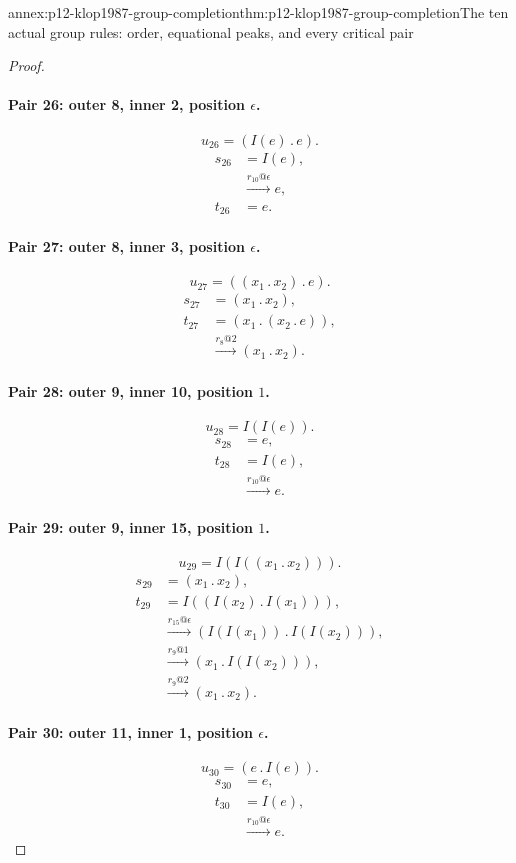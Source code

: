 \begin{annexitem}{annex:p12-klop1987-group-completion}{thm:p12-klop1987-group-completion}{The ten actual group rules: order, equational peaks, and every critical pair}
\begin{proof}
\paragraph{Pair 26: outer 8, inner 2, position \(\epsilon\).}
\[
 u_{26}=(I(e)\mathbin{.}e).
\]
\begin{align*}
 s_{26}&=I(e),\\
 &\xrightarrow{r_{10}@\epsilon}e,\\
 t_{26}&=e.
\end{align*}

\paragraph{Pair 27: outer 8, inner 3, position \(\epsilon\).}
\[
 u_{27}=((x_{1}\mathbin{.}x_{2})\mathbin{.}e).
\]
\begin{align*}
 s_{27}&=(x_{1}\mathbin{.}x_{2}),\\
 t_{27}&=(x_{1}\mathbin{.}(x_{2}\mathbin{.}e)),\\
 &\xrightarrow{r_{8}@2}(x_{1}\mathbin{.}x_{2}).
\end{align*}

\paragraph{Pair 28: outer 9, inner 10, position \(1\).}
\[
 u_{28}=I(I(e)).
\]
\begin{align*}
 s_{28}&=e,\\
 t_{28}&=I(e),\\
 &\xrightarrow{r_{10}@\epsilon}e.
\end{align*}

\paragraph{Pair 29: outer 9, inner 15, position \(1\).}
\[
 u_{29}=I(I((x_{1}\mathbin{.}x_{2}))).
\]
\begin{align*}
 s_{29}&=(x_{1}\mathbin{.}x_{2}),\\
 t_{29}&=I((I(x_{2})\mathbin{.}I(x_{1}))),\\
 &\xrightarrow{r_{15}@\epsilon}(I(I(x_{1}))\mathbin{.}I(I(x_{2}))),\\
 &\xrightarrow{r_{9}@1}(x_{1}\mathbin{.}I(I(x_{2}))),\\
 &\xrightarrow{r_{9}@2}(x_{1}\mathbin{.}x_{2}).
\end{align*}

\paragraph{Pair 30: outer 11, inner 1, position \(\epsilon\).}
\[
 u_{30}=(e\mathbin{.}I(e)).
\]
\begin{align*}
 s_{30}&=e,\\
 t_{30}&=I(e),\\
 &\xrightarrow{r_{10}@\epsilon}e.
\end{align*}


\end{proof}
\end{annexitem}
